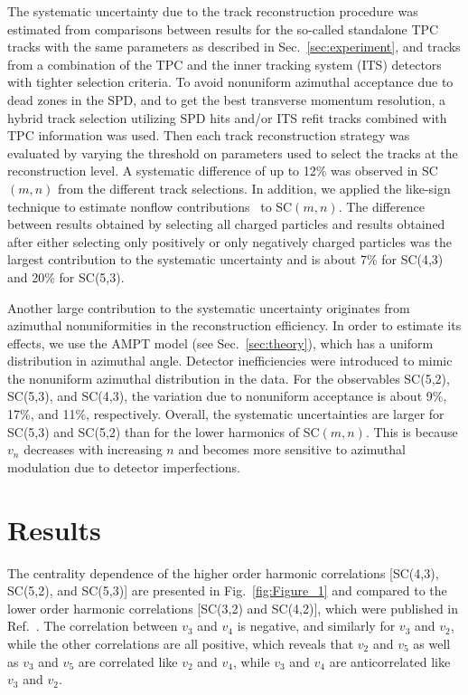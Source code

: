 The systematic uncertainty due to the track reconstruction procedure was estimated from comparisons between results for the so-called standalone TPC tracks with the 
same parameters as described in Sec.~\ref{sec:experiment}, and tracks from a combination of the TPC and the inner tracking system (ITS) detectors with tighter selection criteria.
To avoid nonuniform azimuthal acceptance due to dead zones in the SPD, and to get the best transverse momentum resolution, a hybrid track selection utilizing SPD hits and/or ITS refit tracks combined with TPC information was used.
Then each track reconstruction strategy was evaluated by varying the threshold on parameters used to select the tracks at the reconstruction level. 
A systematic difference of up to 12\% was observed in SC$(m,n)$ from the different track selections. 
In addition, we applied the like-sign technique to estimate nonflow contributions~\cite{Aamodt:2010pa} to SC$(m,n)$. The difference between results obtained by selecting all charged particles and results obtained after either selecting only positively or only negatively charged particles was the largest contribution to the systematic uncertainty and is about 7\% for SC(4,3) and 20\% for SC(5,3). 

Another large contribution to the systematic uncertainty originates from azimuthal nonuniformities in the reconstruction efficiency. In order to estimate its effects, we use the AMPT model (see Sec.~\ref{sec:theory}), which has a uniform distribution in azimuthal angle.
Detector inefficiencies were introduced to mimic the nonuniform azimuthal distribution in the data. For the observables SC(5,2), SC(5,3), and SC(4,3), the variation due to nonuniform acceptance is about 9\%, 17\%, and 11\%, respectively.
Overall, the systematic uncertainties are larger for SC(5,3) and SC(5,2) than for the lower harmonics of SC$(m,n)$.
This is because $v_{n}$ decreases with increasing $n$ and becomes more sensitive to azimuthal modulation due to detector imperfections. 

\section{Results}
\label{sec:results}
The centrality dependence of the higher order harmonic correlations [SC(4,3), SC(5,2), and SC(5,3)] are presented in Fig.~\ref{fig:Figure_1} and compared to the lower order harmonic correlations [SC(3,2) and SC(4,2)], which were published in Ref.~\cite{ALICE:2016kpq}. The correlation between $v_3$ and $v_4$ is negative, and similarly for $v_3$ and $v_2$, while the other correlations are all positive, which reveals that $v_2$ and $v_5$ as well as $v_3$ and $v_5$ are correlated like $v_2$ and $v_4$, while $v_3$ and $v_4$ are anticorrelated like $v_3$ and $v_2$.


